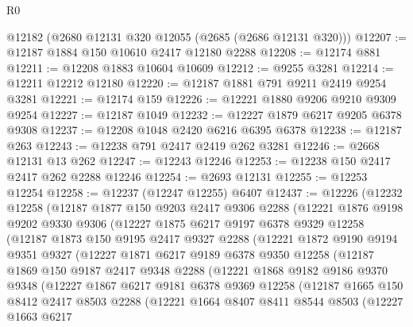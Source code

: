 \begin{lexlean}{R0}
\begin{coremodule}
    @12182
    (@2680 @12131 @320 @12055 (@2685 (@2686 @12131 @320)))
@12207 := @12187 @1884 @150 @10610 @2417 @12180 @2288
@12208 := @12174 @881
@12211 := @12208 @1883 @10604 @10609
@12212 := @9255 @3281
@12214 := @12211 @12212 @12180
@12220 := @12187 @1881 @791 @9211 @2419 @9254 @3281
@12221 := @12174 @159
@12226 := @12221 @1880 @9206 @9210 @9309 @9254
@12227 := @12187 @1049
@12232 := @12227 @1879 @6217 @9205 @6378 @9308
@12237 := @12208 @1048 @2420 @6216 @6395 @6378
@12238 := @12187 @263
@12243 := @12238 @791 @2417 @2419 @262 @3281
@12246 := @2668 @12131 @13 @262
@12247 := @12243 @12246
@12253 := @12238 @150 @2417 @2417 @262 @2288 @12246
@12254 := @2693 @12131
@12255 := @12253 @12254
@12258 := @12237 (@12247 @12255) @6407
@12437 := @12226
    (@12232
      @12258
      (@12187
        @1877
        @150
        @9203
        @2417
        @9306
        @2288
        (@12221
          @1876
          @9198
          @9202
          @9330
          @9306
          (@12227
            @1875
            @6217
            @9197
            @6378
            @9329
            @12258
            (@12187
              @1873
              @150
              @9195
              @2417
              @9327
              @2288
              (@12221
                @1872
                @9190
                @9194
                @9351
                @9327
                (@12227
                  @1871
                  @6217
                  @9189
                  @6378
                  @9350
                  @12258
                  (@12187
                    @1869
                    @150
                    @9187
                    @2417
                    @9348
                    @2288
                    (@12221
                      @1868
                      @9182
                      @9186
                      @9370
                      @9348
                      (@12227
                        @1867
                        @6217
                        @9181
                        @6378
                        @9369
                        @12258
                        (@12187
                          @1665
                          @150
                          @8412
                          @2417
                          @8503
                          @2288
                          (@12221
                            @1664
                            @8407
                            @8411
                            @8544
                            @8503
                            (@12227
                              @1663
                              @6217

\end{coremodule}
\end{lexlean}
